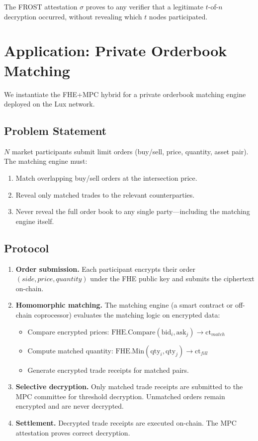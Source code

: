 \documentclass[11pt,a4paper]{article}
\begin{document}
The FROST attestation $\sigma$ proves to any verifier that a legitimate $t$-of-$n$ decryption occurred, without revealing which $t$ nodes participated.

\section{Application: Private Orderbook Matching}

We instantiate the FHE+MPC hybrid for a private orderbook matching engine deployed on the Lux network.

\subsection{Problem Statement}

$N$ market participants submit limit orders (buy/sell, price, quantity, asset pair). The matching engine must:
\begin{enumerate}[leftmargin=2em]
\item Match overlapping buy/sell orders at the intersection price.
\item Reveal only matched trades to the relevant counterparties.
\item Never reveal the full order book to any single party---including the matching engine itself.
\end{enumerate}

\subsection{Protocol}

\begin{enumerate}[leftmargin=2em]
\item \textbf{Order submission.} Each participant encrypts their order $(side, price, quantity)$ under the FHE public key and submits the ciphertext on-chain.
\item \textbf{Homomorphic matching.} The matching engine (a smart contract or off-chain coprocessor) evaluates the matching logic on encrypted data:
    \begin{itemize}
    \item Compare encrypted prices: $\text{FHE.Compare}(\text{bid}_i, \text{ask}_j) \to \text{ct}_{match}$
    \item Compute matched quantity: $\text{FHE.Min}(\text{qty}_i, \text{qty}_j) \to \text{ct}_{fill}$
    \item Generate encrypted trade receipts for matched pairs.
    \end{itemize}
\item \textbf{Selective decryption.} Only matched trade receipts are submitted to the MPC committee for threshold decryption. Unmatched orders remain encrypted and are never decrypted.
\item \textbf{Settlement.} Decrypted trade receipts are executed on-chain. The MPC attestation proves correct decryption.
\end{enumerate}
\end{document}
